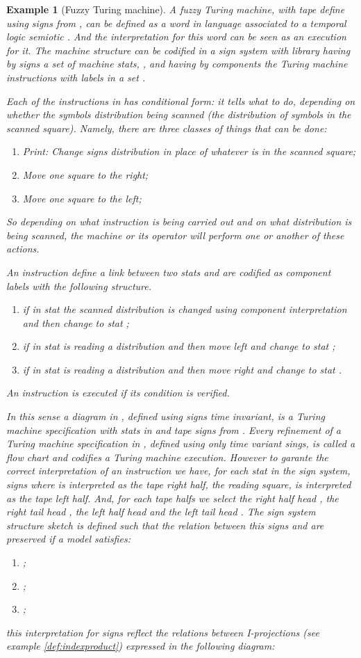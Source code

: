 \documentclass[oribibl]{llncs}
\newtheorem{exam}{Example}
\begin{document}
\begin{exam}[Fuzzy Turing machine]
A fuzzy Turing machine, with tape define using signs from , can be defined as a word in language associated to a temporal logic semiotic . And the interpretation for this word can be seen as an execution for it.  The machine structure can be codified in a sign system  with library  having by signs a set of machine stats, , and having by components the Turing machine instructions with labels in a set .

Each of the instructions in  has conditional form: it tells what to do, depending on whether the symbols distribution being scanned (the distribution of symbols in the scanned square). Namely, there are three classes of things that can be done:
\begin{enumerate}
  \item Print: Change signs distribution in place of whatever is in the scanned square;
  \item Move one square to the right;
  \item Move one square to the left;
\end{enumerate}
So depending on what instruction is being carried out and on what distribution is being scanned, the machine or its operator will perform one or another of these actions.

An instruction define a link between two stats and are codified as component labels with the following structure.
\begin{enumerate}
  \item  if in stat  the scanned distribution is changed using component  interpretation and then change to stat ;
  \item  if in stat  is reading a distribution  and   then move left and change to stat ;
  \item  if in stat  is reading a distribution  and   then move right and change to stat .
\end{enumerate} An instruction is executed if its condition is verified.

 In this sense a diagram in , defined using signs time invariant, is a \emph{Turing machine specification} with stats in  and tape signs from .  Every refinement of a Turing machine specification in , defined using only time variant sings, is called a \emph{flow chart} and codifies a Turing machine execution. However to garante the correct interpretation of an instruction we have, for each stat  in the sign system,  signs 
 where  is interpreted as the tape right half,  the reading square,  is interpreted as the tape left half. And, for each tape halfs we select the right half head , the right tail head , the left half head  and the left tail head . The sign system structure sketch is defined such that the relation between this signs and  are preserved if a model  satisfies:
 \begin{enumerate}
   \item ;
   \item ;
   \item ;
 \end{enumerate}
this interpretation for signs reflect the relations between I-projections (see example  \ref{def:indexproduct}) expressed in the following diagram:


\end{exam}
\end{document}
